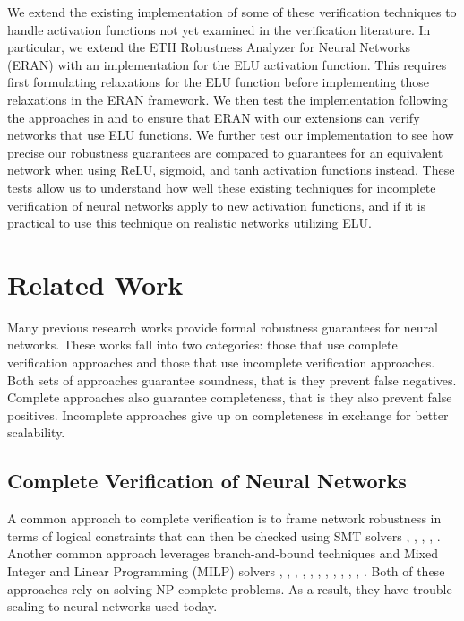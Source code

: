 \documentclass{llncs}
\begin{document}
We extend the existing implementation of some of these verification techniques to  handle activation functions not yet examined in the verification literature.
In particular, we extend the ETH Robustness Analyzer for Neural Networks (ERAN) \cite{ERAN} with an implementation for the ELU activation function.
This requires first formulating relaxations for the ELU function before implementing those relaxations in the ERAN framework.
We then test the implementation following the approaches in \cite{muller2022prima} and \cite{singh2019abstract} to ensure that ERAN with our extensions can verify networks that use ELU functions.
We further test our implementation to see how precise our robustness guarantees are compared to guarantees for an equivalent network when using ReLU, sigmoid, and tanh activation functions instead.
These tests allow us to understand how well these existing techniques for incomplete verification of neural networks apply to new activation functions, and if it is practical to use this technique on realistic networks utilizing ELU.



\section{Related Work}

Many previous research works provide formal robustness guarantees for neural networks.
These works fall into two categories: those that use complete verification approaches and those that use incomplete verification approaches.
Both sets of approaches guarantee soundness, that is they prevent false negatives.
Complete approaches also guarantee completeness, that is they also prevent false positives.
Incomplete approaches give up on completeness in exchange for better scalability.

\subsection{Complete Verification of Neural Networks}
A common approach to complete verification is to frame network robustness in terms of logical constraints that can then be checked using SMT solvers \cite{ehlers2017formal}, \cite{huang2017safety}, \cite{katz2017reluplex}, \cite{katz2019marabou}, \cite{pulina2010abstraction}.
Another common approach leverages branch-and-bound techniques and Mixed Integer and Linear Programming (MILP) solvers \cite{anderson2020strong}, \cite{botoeva2020efficient}, \cite{bunel2020branch}, \cite{lu2019neural}, \cite{de2021scaling}, \cite{tjeng2017evaluating}, \cite{wang2021beta}, \cite{xu2020fast}, \cite{cheng2017maximum}, \cite{fischetti2018deep}, \cite{bunel2018unified}, \cite{dutta2018output}.
Both of these approaches rely on solving NP-complete problems.
As a result, they have trouble scaling to neural networks used today.
\end{document}
